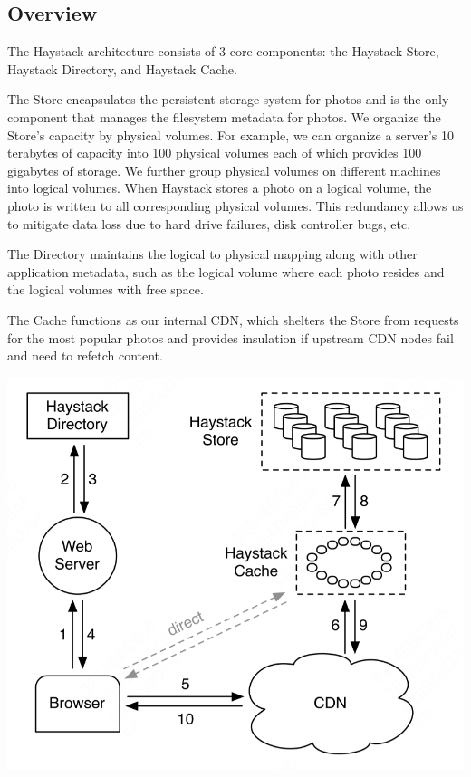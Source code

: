 \documentclass[11pt]{article}
\begin{document}
\subsection{Overview}
\label{sec:orgcc50960}
The Haystack architecture consists of 3 core components: the Haystack Store, Haystack Directory, and
Haystack Cache.

The Store encapsulates the persistent storage system for photos and is the only component that manages
the filesystem metadata for photos. We organize the Store’s capacity by physical volumes. For example,
we can organize a server’s 10 terabytes of capacity into 100 physical volumes each of which provides
100 gigabytes of storage. We further group physical volumes on different machines into logical
volumes. When Haystack stores a photo on a logical volume, the photo is written to all corresponding
physical volumes. This redundancy allows us to mitigate data loss due to hard drive failures, disk
controller bugs, etc.

The Directory maintains the logical to physical mapping along with other application metadata, such as
the logical volume where each photo resides and the logical volumes with free space.

The Cache functions as our internal CDN, which shelters the Store from requests for the most popular
photos and provides insulation if upstream CDN nodes fail and need to refetch content.

\begin{center}
\includegraphics[width=.8\textwidth]{../../images/papers/134.png}
\end{center}
\end{document}
